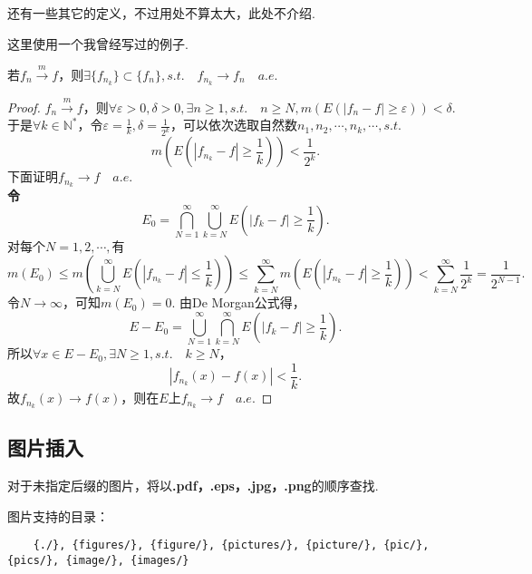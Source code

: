 \documentclass[bwprint, withouttitlepage, openfonts]{mathexpthesis}
\begin{document}
还有一些其它的定义，不过用处不算太大，此处不介绍.

这里使用一个我曾经写过的例子.

\begin{theorem}[Risez定理]
    若$f_n \stackrel{m}{\longrightarrow} f$，则$\exists \{f_{n_k}\} \subset \{f_n\}, s.t. \quad f_{n_k} \to f_n \quad a.e.$
\end{theorem}

\begin{proof}
    $f_n \stackrel{m}{\longrightarrow} f$，则$\forall \varepsilon > 0, \delta > 0, \exists n \geqslant 1, s.t. \quad n \geqslant N, m(E(|f_n - f| \geqslant \varepsilon)) < \delta$.
    于是$\forall k \in \mathbb{N}^*$，令$\varepsilon = \frac{1}{k}, \delta = \frac{1}{2^k}$，可以依次选取自然数$n_1, n_2, \cdots, n_k, \cdots, s.t.$
    \begin{equation*}
        m(E(|f_{n_k} - f| \geqslant \frac{1}{k})) < \frac{1}{2^k}.
    \end{equation*}
    下面证明$f_{n_k} \to f \quad a.e.$ \\
    \textbf{令\[E_0 = \bigcap_{N = 1}^{\infty}{\bigcup_{k = N}^{\infty}{E(|f_k - f| \geqslant \frac{1}{k})}}.\]}
    对每个$N = 1, 2, \cdots, $有
    \begin{equation*}
        m(E_0) \leqslant m(\bigcup_{k = N}^{\infty}{E(|f_{n_k} - f| \leqslant \frac{1}{k})}) \leqslant \sum_{k = N}^{\infty}{m(E(|f_{n_k} - f| \geqslant \frac{1}{k}))} < \sum_{k = N}^{\infty}{\frac{1}{2^k}} = \frac{1}{2^{N - 1}}.
    \end{equation*}
    令$N \to \infty$，可知$m(E_0) = 0$.
    由De Morgan公式得，
    \begin{equation*}
        E - E_0 = \bigcup_{N = 1}^{\infty}{\bigcap_{k = N}^{\infty}{E(|f_k - f| \geqslant \frac{1}{k})}}.
    \end{equation*}
    所以$\forall x \in E - E_0, \exists N \geqslant 1, s.t. \quad k \geqslant N$，
    \begin{equation*}
        |f_{n_k}(x) - f(x)| < \frac{1}{k}.
    \end{equation*}
    故$f_{n_k}(x) \to f(x)$，则在$E$上$f_{n_k} \to f \quad a.e.$
\end{proof}

\subsection{图片插入}
对于未指定后缀的图片，将以\textbf{.pdf，.eps，.jpg，.png}的顺序查找.

图片支持的目录：
\begin{verbatim}
    {./}, {figures/}, {figure/}, {pictures/}, {picture/}, {pic/}, {pics/}, {image/}, {images/}
\end{verbatim}
\end{document}
